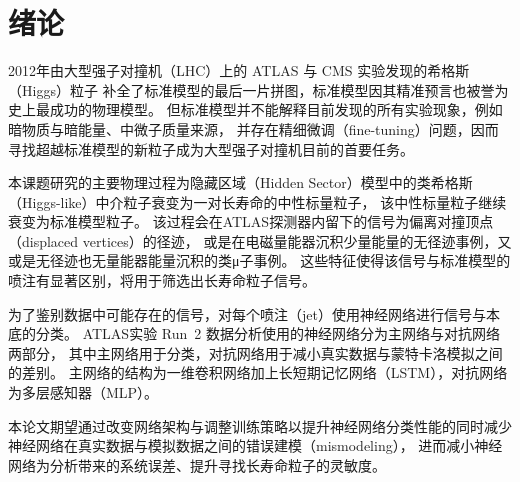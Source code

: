 
\chapter{绪论}

2012年由大型强子对撞机（LHC）上的 ATLAS 与 CMS 实验发现的希格斯（Higgs）粒子
\cite{aad2012observation} 补全了标准模型的最后一片拼图，标准模型因其精准预言也被誉为史上最成功的物理模型。
但标准模型并不能解释目前发现的所有实验现象，例如暗物质与暗能量、中微子质量来源，
并存在精细微调（fine-tuning）问题，因而寻找超越标准模型的新粒子成为大型强子对撞机目前的首要任务。

本课题研究的主要物理过程为隐藏区域（Hidden Sector）模型中的类希格斯（Higgs-like）中介粒子衰变为一对长寿命的中性标量粒子，
该中性标量粒子继续衰变为标准模型粒子。
该过程会在ATLAS探测器内留下的信号为偏离对撞顶点（displaced vertices）的径迹，
或是在电磁量能器沉积少量能量的无径迹事例，又或是无径迹也无量能器能量沉积的类μ子事例。
这些特征使得该信号与标准模型的喷注有显著区别，将用于筛选出长寿命粒子信号。

为了鉴别数据中可能存在的信号，对每个喷注（jet）使用神经网络进行信号与本底的分类。
ATLAS实验 Run~2 数据分析\cite{ATLAS:2022zhj}使用的神经网络分为主网络与对抗网络两部分，
其中主网络用于分类，对抗网络用于减小真实数据与蒙特卡洛模拟之间的差别。
主网络的结构为一维卷积网络加上长短期记忆网络（LSTM），对抗网络为多层感知器（MLP）。

本论文期望通过改变网络架构与调整训练策略以提升神经网络分类性能的同时减少神经网络在真实数据与模拟数据之间的错误建模（mismodeling），
进而减小神经网络为分析带来的系统误差、提升寻找长寿命粒子的灵敏度。
